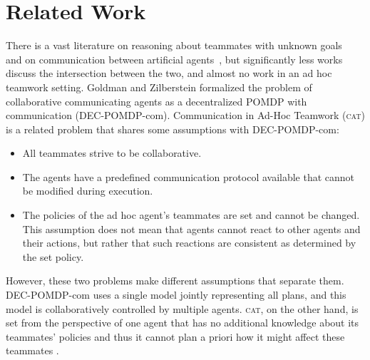 \documentclass[letterpaper]{article}
\begin{document}

\section{Related Work}
There is a vast literature on reasoning about teammates with unknown goals~\cite{fern2007decision,albrecht2018autonomous} and on communication between artificial agents~\cite{cohen1997team,decker1987distributed}, but significantly less works discuss the intersection between the two, and almost no work in an ad hoc teamwork setting.
Goldman and Zilberstein  formalized the problem of collaborative communicating agents as a decentralized POMDP with communication (DEC-POMDP-com). 
Communication in Ad-Hoc Teamwork (\textsc{cat}) is a related problem that shares some assumptions with DEC-POMDP-com: 
\begin{itemize}
    \item All teammates strive to be collaborative.
    \item The agents have a predefined communication protocol available that cannot be modified during execution.
    \item The policies of the ad hoc agent's teammates are set and cannot be changed.  This assumption does not mean that agents cannot react to other agents and their actions, but rather that such reactions are consistent as determined by the set policy.
\end{itemize} 
However, these two problems make different assumptions that separate them. DEC-POMDP-com uses a single model jointly representing all plans, and this model is collaboratively controlled by multiple agents. \textsc{cat}, on the other hand, is set from the perspective of one agent that has no additional knowledge about its teammates' policies and thus it cannot plan a priori how it might affect these teammates \cite{stone2013teaching,ravula2019ad}.
\end{document}
